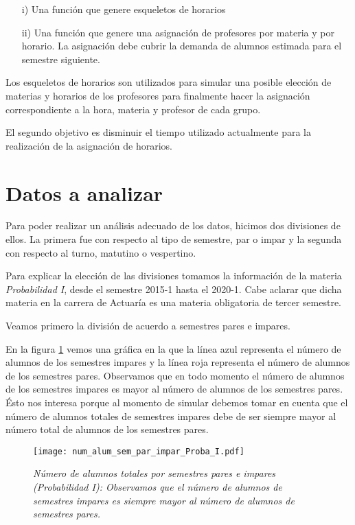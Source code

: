 \begin{enumerate}
\item[i)] Una función que genere esqueletos de horarios

\item[ii)] Una función que genere una asignación de profesores por materia y por horario. La asignación debe cubrir la demanda de alumnos estimada para el semestre siguiente.
\end{enumerate}


Los esqueletos de horarios son utilizados para simular una posible elección de materias y horarios de los profesores para finalmente hacer la asignación correspondiente a la hora, materia y profesor de cada grupo.

El segundo objetivo es disminuir el tiempo utilizado actualmente para la realización de la asignación de horarios.


\section{Datos a analizar}

Para poder realizar un análisis adecuado de los datos, hicimos dos divisiones de ellos. La primera fue con respecto al tipo de semestre, par o impar y la segunda con respecto al turno, matutino o vespertino.

Para explicar la elección de las divisiones tomamos la información de la materia \textit{Probabilidad I}, desde el semestre 2015-1 hasta el 2020-1. Cabe aclarar que dicha materia en la carrera de Actuaría es una materia obligatoria de tercer semestre.

Veamos primero la división de acuerdo a semestres pares e impares.

En la figura \ref{ParImparProbaI} vemos una gráfica en la que la línea azul representa el número de alumnos de los semestres impares y la línea roja representa el número de alumnos de los semestres pares. Observamos que en todo momento el número de alumnos de los semestres impares es mayor al número de alumnos de los semestres pares. Ésto nos interesa porque al momento de simular debemos tomar en cuenta que el número de alumnos totales de semestres impares debe de ser siempre mayor al número total de alumnos de los semestres pares.

\begin{figure}[H]
\centering
\texttt{[image: num\_alum\_sem\_par\_impar\_Proba\_I.pdf]} %
\caption[\textit{Número de alumnos totales por semestres pares e impares: Probabilidad I}]{\textit{Número de alumnos totales por semestres pares e impares (Probabilidad I): Observamos que el número de alumnos de semestres impares es siempre mayor al número de alumnos de semestres pares.}}\label{ParImparProbaI}
\end{figure}

